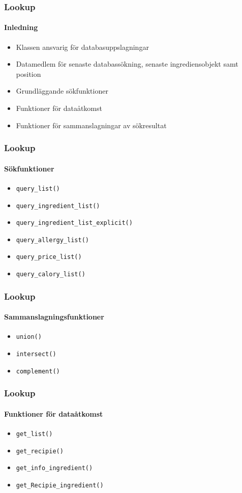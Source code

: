 
\begin{frame}
  \frametitle{Lookup}
  \framesubtitle{Inledning}
  \begin{itemize}
    \item<1-> Klassen ansvarig för databasuppslagningar
    \item<2-> Datamedlem för senaste databassökning, senaste ingrediensobjekt samt position
    \item<3-> Grundläggande sökfunktioner
    \item<4-> Funktioner för dataåtkomst
    \item<5-> Funktioner för sammanslagningar av sökresultat
 \end{itemize}
\end{frame}


\begin{frame}
  \frametitle{Lookup}
  \framesubtitle{Sökfunktioner}
  \begin{itemize}
    \item<1-> \texttt{query\_list()}
    \item<2-> \texttt{query\_ingredient\_list()}
    \item<3-> \texttt{query\_ingredient\_list\_explicit()}
    \item<4-> \texttt{query\_allergy\_list()}
    \item<5-> \texttt{query\_price\_list()}
    \item<6-> \texttt{query\_calory\_list()}
  \end{itemize}
\end{frame}

\begin{frame}
  \frametitle{Lookup}
  \framesubtitle{Sammanslagningsfunktioner}
  \begin{itemize}
    \item<1-> \texttt{union()}
    \item<2-> \texttt{intersect()}
    \item<3-> \texttt{complement()}
  \end{itemize}
\end{frame}

\begin{frame}
  \frametitle{Lookup}
  \framesubtitle{Funktioner för dataåtkomst}
  \begin{itemize}
    \item<1-> \texttt{get\_list()}
    \item<2-> \texttt{get\_recipie()}
    \item<3-> \texttt{get\_info\_ingredient()}
    \item<4-> \texttt{get\_Recipie\_ingredient()}
  \end{itemize}
\end{frame}



